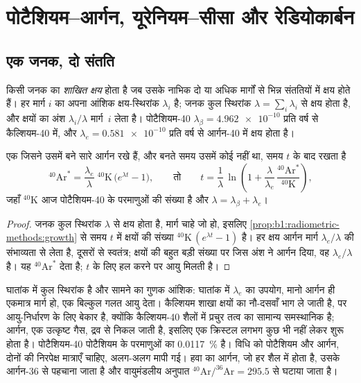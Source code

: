 \section{पोटैशियम–आर्गन, यूरेनियम–सीसा और रेडियोकार्बन}\label{sec:b1:radiometric-methods:kar}

\subsection*{एक जनक, दो संतति}

\begin{definition}[शाखित क्षय]\label{def:b1:radiometric-methods:branching}
किसी जनक का \emph{शाखित क्षय} होता है जब उसके नाभिक दो या अधिक मार्गों से भिन्न संततियों में क्षय होते हैं। हर मार्ग $i$ का अपना आंशिक क्षय-स्थिरांक $\lambda_i$ है; जनक कुल स्थिरांक $\lambda = \sum_i \lambda_i$ से क्षय होता है, और क्षयों का अंश $\lambda_i/\lambda$ मार्ग~$i$ लेता है। पोटैशियम-40 $\lambda_\beta =
\num{4.962e-10}$ प्रति वर्ष से कैल्शियम-40 में, और $\lambda_e = \num{0.581e-10}$ प्रति वर्ष से आर्गन-40 में क्षय होता है।
\end{definition}

\begin{proposition}[पोटैशियम–आर्गन आयु]\label{prop:b1:radiometric-methods:kar}
एक  जिसने उसमें बने सारे आर्गन रखे हैं, और बनते समय उसमें कोई नहीं था, समय $t$ के बाद रखता है
\[
  {}^{40}\mathrm{Ar}^* = \frac{\lambda_e}{\lambda}\;{}^{40}\mathrm{K}\,\bigl(e^{\lambda t} - 1\bigr),
  \qquad\text{तो}\qquad
  t = \frac{1}{\lambda}\,\ln\!\left(1 + \frac{\lambda}{\lambda_e}\,
      \frac{{}^{40}\mathrm{Ar}^*}{{}^{40}\mathrm{K}}\right),
\]
जहाँ ${}^{40}\mathrm{K}$ आज पोटैशियम-40 के परमाणुओं की संख्या है और $\lambda =
\lambda_\beta + \lambda_e$।
\end{proposition}

\begin{proof}
जनक कुल स्थिरांक $\lambda$ से क्षय होता है, मार्ग चाहे जो हो, इसलिए \cref{prop:b1:radiometric-methods:growth} से समय $t$ में क्षयों की संख्या ${}^{40}\mathrm{K}\,(e^{\lambda t} - 1)$ है। हर क्षय आर्गन मार्ग $\lambda_e/\lambda$ की संभाव्यता से लेता है, दूसरों से स्वतंत्र; क्षयों की बहुत बड़ी संख्या पर जिस अंश ने आर्गन दिया, वह $\lambda_e/\lambda$ है। यह ${}^{40}\mathrm{Ar}^*$ देता है; $t$ के लिए हल करने पर आयु मिलती है।
\end{proof}

घातांक में कुल स्थिरांक है और सामने का गुणक आंशिक: घातांक में $\lambda_e$ का उपयोग, मानो आर्गन ही एकमात्र मार्ग हो, एक बिल्कुल गलत आयु देता। कैल्शियम शाखा क्षयों का नौ-दसवाँ भाग ले जाती है, पर आयु-निर्धारण के लिए बेकार है, क्योंकि कैल्शियम-40 शैलों में प्रचुर तत्व का सामान्य समस्थानिक है; आर्गन, एक उत्कृष्ट गैस, द्रव से निकल जाती है, इसलिए एक क्रिस्टल लगभग कुछ भी नहीं लेकर शुरू होता है। पोटैशियम-40 पोटैशियम के परमाणुओं का \qty{0.0117}{\percent} है। विधि को पोटैशियम और आर्गन, दोनों की निरपेक्ष मात्राएँ चाहिए, अलग-अलग मापी गई। हवा का आर्गन, जो हर शैल में होता है, उसके आर्गन-36 से पहचाना जाता है और वायुमंडलीय अनुपात $^{40}\mathrm{Ar}/^{36}\mathrm{Ar} = 295.5$ से घटाया जाता है।

